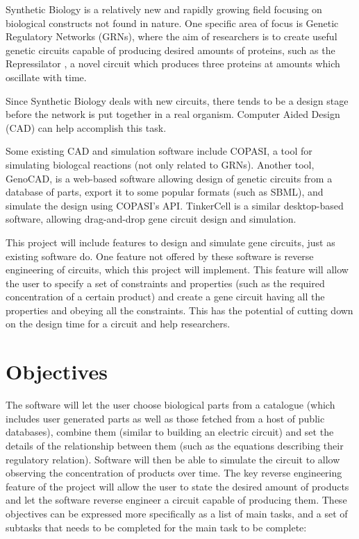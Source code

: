 \documentclass{article}
\begin{document}
	\par Synthetic Biology is a relatively new and rapidly growing field focusing on biological constructs not found in nature. One specific area of focus is Genetic Regulatory Networks (GRNs), where the aim of researchers is to create useful genetic circuits capable of producing desired amounts of proteins, such as the Repressilator \cite{repressilator}, a novel circuit which produces three proteins at amounts which oscillate with time.
	\par Since Synthetic Biology deals with new circuits, there tends to be a design stage before the network is put together in a real organism. Computer Aided Design (CAD) can help accomplish this task.
	\par Some existing CAD and simulation software include COPASI\cite{copasi}, a tool for simulating biologcal reactions (not only related to GRNs). Another tool, GenoCAD\cite{genocad}, is a web-based software allowing design of genetic circuits from a database of parts, export it to some popular formats (such as SBML), and simulate the design using COPASI's API. TinkerCell\cite{tinkercell} is a similar desktop-based software, allowing drag-and-drop gene circuit design and simulation.
	\par This project will include features to design and simulate gene circuits, just as existing software do. One feature not offered by these software is reverse engineering of circuits, which this project will implement. This feature will allow the user to specify a set of constraints and properties (such as the required concentration of a certain product) and create a gene circuit having all the properties and obeying all the constraints. This has the potential of cutting down on the design time for a circuit and help researchers.
	
	
	
	
	\section{Objectives}
	\par The software will let the user choose biological parts from a catalogue (which includes user generated parts as well as those fetched from a host of public databases), combine them (similar to building an electric circuit) and set the details of the relationship between them (such as the equations describing their regulatory relation). Software will then be able to simulate the circuit to allow observing the concentration of products over time. The key reverse engineering feature of the project will allow the user to state the desired amount of products and let the software reverse engineer a circuit capable of producing them. These objectives can be expressed more specifically as a list of main tasks, and a set of subtasks that needs to be completed for the main task to be complete:
	
\end{document}
